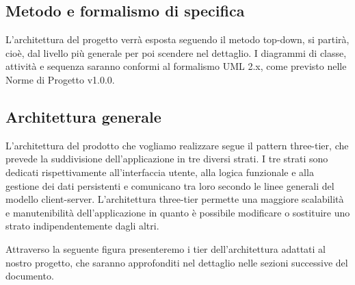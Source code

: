 \subsection{Metodo e formalismo di specifica}
L'architettura del progetto verrà esposta seguendo il metodo top-down, si partirà, cioè, dal livello più generale per poi scendere nel dettaglio. I diagrammi di classe, attività e sequenza saranno conformi al formalismo UML 2.x, come previsto nelle Norme di Progetto v1.0.0.

\subsection{Architettura generale}
L'architettura del prodotto che vogliamo realizzare segue il pattern three-tier, che prevede la suddivisione dell'applicazione in tre diversi strati. I tre strati sono dedicati rispettivamente all'interfaccia utente, alla logica funzionale e alla gestione dei dati persistenti e comunicano tra loro secondo le linee generali del modello client-server. L'architettura three-tier permette una maggiore scalabilità e manutenibilità dell'applicazione in quanto è possibile modificare o sostituire uno strato indipendentemente dagli altri.

Attraverso la seguente figura presenteremo i tier dell'architettura adattati al nostro progetto, che saranno approfonditi nel dettaglio nelle sezioni successive del documento.

